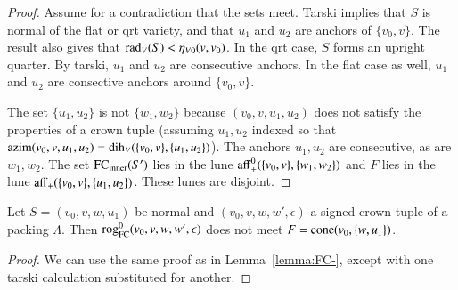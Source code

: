 \begin{proof}  Assume for a contradiction that the sets meet.
Tarski
implies that $S$ is normal of the flat or qrt variety, and 
that $u_1$ and $u_2$ are anchors of $\{v_0,v\}$.  
The result also gives that 
$\operatorname{rad}_V(S)<\eta_{V0}(v,v_0)$.    
In the qrt case, $S$ forms
an upright quarter.  By tarski, $u_1$ and $u_2$
are consecutive anchors. In the flat case as well, 
$u_1$ and $u_2$ are consective
anchors around $\{v_0,v\}$.

The set $\{u_1,u_2\}$ is not $\{w_1,w_2\}$ because $(v_0,v,u_1,u_2)$
does not satisfy the properties of a crown tuple (assuming $u_1,u_2$
indexed so that ${\operatorname{azim}}(v_0,v,u_1,u_2) = \operatorname{dih}_V(\{v_0,v\},\{u_1,u_2\})$).  The anchors $u_1,u_2$ are consecutive, as are $w_1,w_2$.
The set ${\operatorname{FC}}_{\text{inner}}(S')$ lies in the lune ${\operatorname{aff}}_+^0(\{v_0,v\},\{w_1,w_2\})$ and $F$ lies in the lune ${\operatorname{aff}}_+(\{v_0,v\},\{u_1,u_2\})$.
These lunes are disjoint.
%
\end{proof}

\begin{lemma}
Let $S=(v_0,v,w,u_1)$ be normal and $(v_0,v,w,w',\epsilon)$ a signed crown tuple
of a packing $\Lambda$.  
Then
${\operatorname{rog}}^0_{\text{FC}}(v_0,v,w,w',\epsilon)$
does not meet $F={\operatorname{cone}}(v_0,\{w,u_1\})$.
\end{lemma}

\begin{proof}  We can use the same proof as in Lemma~\ref{lemma:FC-},
except with one tarski calculation 
substituted for 
another.
\end{proof}


